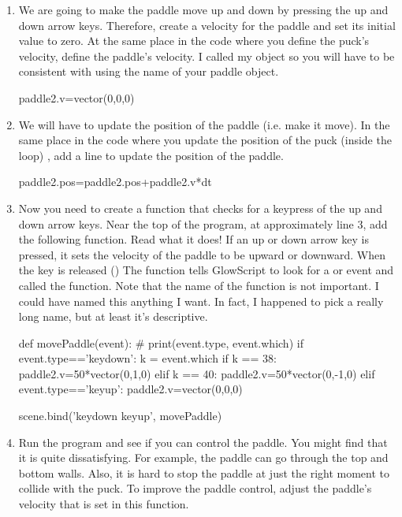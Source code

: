 \begin{enumerate}
\item We are going to make the paddle move up and down by pressing the up and down arrow keys. Therefore, create a velocity for the paddle and set its initial value to zero. At the same place in the code where you define the puck's velocity, define the paddle's velocity. I called my object  so you will have to be consistent with using the name of your paddle object.

\begin{myvpython}
paddle2.v=vector(0,0,0)
\end{myvpython}

\item We will have to update the position of the paddle (i.e. make it move). In the same place in the code where you update the position of the puck  (inside the  loop) , add a line to update the position of the paddle.

\begin{myvpython}
    paddle2.pos=paddle2.pos+paddle2.v*dt
\end{myvpython}

\item Now you need to create a function that checks for a keypress of the up and down arrow keys. Near the top of the program, at approximately line 3, add the following  function. Read what it does!  If an up or down arrow key is pressed, it sets the velocity of the paddle to be upward or downward. When the key is released () The  function tells GlowScript to look for a  or  event and called the  function. Note that the name of the function  is not important. I could have named this anything I want. In fact, I happened to pick a really long name, but at least it's descriptive.

\begin{myvpython}
def movePaddle(event):
#    print(event.type, event.which)
    if event.type=='keydown':
            k = event.which
            if k == 38:
                paddle2.v=50*vector(0,1,0)
            elif k == 40:
                paddle2.v=50*vector(0,-1,0)
    elif event.type=='keyup':
            paddle2.v=vector(0,0,0)

scene.bind('keydown keyup', movePaddle) 
\end{myvpython}

\item Run the program and see if you can control the paddle. You might find that it is quite dissatisfying. For example, the paddle can go through the top and bottom walls. Also, it is hard to stop the paddle at just the right moment to collide with the puck. To improve the paddle control, adjust the paddle's velocity that is set in this function.

\vspace{5in}

\end{enumerate}

